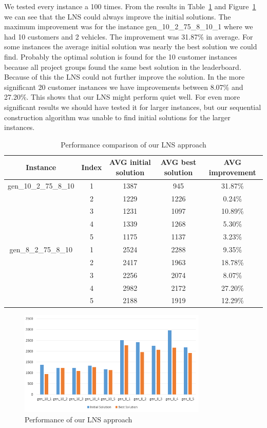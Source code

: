 \documentclass[fleqn]{scrartcl}
\begin{document}
We tested every instance a 100 times. From the results in Table~\ref{tab:performance} and Figure~\ref{fig:performance} we can see that the LNS could always improve the initial solutions. The maximum improvement was for the instance gen\_10\_2\_75\_8\_10\_1 where we had 10 customers and 2 vehicles. The improvement was 31.87\% in average. For some instances the average initial solution was nearly the best solution we could find. Probably the optimal solution is found for the 10 customer instances because all project groups found the same best solution in the leaderboard. Because of this the LNS could not further improve the solution. In the more significant 20 customer instances we have improvements between 8.07\% and 27.20\%. This shows that our LNS might perform quiet well. For even more significant results we should have tested it for larger instances, but our sequential construction algorithm was unable to find initial solutions for the larger instances.

\begin{table}[H]
\begin{tabular}{|c|c|c|c|c|}
\hline 
Instance & Index & AVG initial solution & AVG best solution & AVG improvement \\ 
\hline 
gen\_10\_2\_75\_8\_10 & 1 & 1387 & 945 & 31.87\% \\ 
\hline 
& 2 & 1229 & 1226 & 0.24\% \\ 
\hline 
& 3 & 1231 & 1097 & 10.89\% \\ 
\hline 
& 4 & 1339 & 1268 & 5.30\% \\ 
\hline 
& 5 & 1175 & 1137 & 3.23\% \\ 
\hline 
gen\_8\_2\_75\_8\_10 & 1 & 2524 & 2288 & 9.35\% \\ 
\hline 
& 2 & 2417 & 1963 & 18.78\% \\ 
\hline 
& 3 & 2256 & 2074 & 8.07\% \\ 
\hline 
& 4 & 2982 & 2172 & 27.20\% \\ 
\hline 
& 5 & 2188 & 1919 & 12.29\% \\ 
\hline 
\end{tabular}
\caption{Performance comparison of our LNS approach}
\label{tab:performance}
\end{table}

\begin{figure}[H] 
\centering
\includegraphics[width=0.8\textwidth]{files/performance_lns.png}
\caption{Performance of our LNS approach}
\label{fig:performance}
\end{figure}
\end{document}
